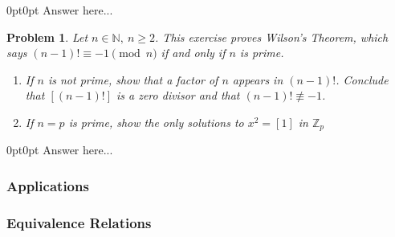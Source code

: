 \documentclass[12pt]{article}
\newtheorem{problem}{Problem}
\numberwithin{problem}{section} %
\theoremstyle{remark}  %
\newenvironment{answer}
    {\begin{adjustwidth}{0pt}{0pt}}
    {\end{adjustwidth}}
\begin{document}
\begin{answer}
    Answer here...
\end{answer}
\vspace{5pt}
\begin{problem}
    Let $n\in\mathbb{N},\ n\geq 2$. This exercise proves \emph{Wilson's Theorem}, which says $(n-1)!\equiv -1 \pmod{n}$ if and only if $n$ is prime.
    \begin{enumerate}[label=(\alph*)]
        \item If $n$ is not prime, show that a factor of $n$ appears in $(n-1)!$. Conclude that $[(n-1)!]$ is a zero divisor and that $(n-1)!\not \equiv-1$.
        \item If $n=p$ is prime, show the only solutions to $x^2=[1]$ in $\mathbb{Z}_p$
    \end{enumerate}
\end{problem}
\begin{answer}
    Answer here...
\end{answer}


\subsubsection{Applications}

\subsubsection{Equivalence Relations}

\iffalse
\end{document}
